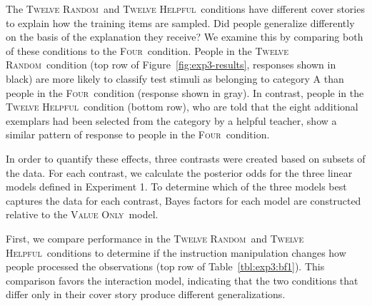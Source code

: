 \documentclass[doc,apacite]{apa6}
\newcommand{\four}{\textsc{Four}}
\newcommand{\random}{\textsc{Twelve Random}}
\newcommand{\helpful}{\textsc{Twelve Helpful}}
\newcommand{\neutral}{\textsc{Four}}
\newcommand{\valueonly}{\textsc{Value Only}}
\begin{document}
The \random\ and \helpful\ conditions have different cover stories to explain how the training items are sampled. Did people generalize differently on the basis of the explanation they receive? 
We examine this by comparing both of these conditions to the \neutral\ condition.
People in the \random\ condition (top row of Figure~\ref{fig:exp3-results}, responses shown in black) are more likely to classify test stimuli as belonging to category A than people in the \neutral\ condition (response shown in gray).
%
In contrast, people in the \helpful\
condition (bottom row), who are told that the eight additional exemplars had been selected
from the category by a helpful teacher, show a similar pattern of response to people in the \neutral\ condition.

In order to quantify these effects, three contrasts were created based on subsets of the data. 
For each contrast, we calculate the posterior odds for
the three linear models defined in Experiment 1.
To determine which of the three models best captures the data for each contrast, Bayes factors for each model are constructed relative to the \valueonly\ model.

First, we compare performance in the \random\ and \helpful\ conditions to determine if the instruction manipulation changes how people processed the observations (top row of Table~\ref{tbl:exp3:bf1}). 
This comparison favors the interaction model, indicating that the two conditions that differ only in their cover story produce different generalizations.
\end{document}
